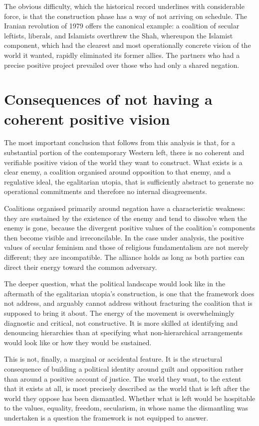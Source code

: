 	The obvious difficulty, which the historical record underlines with considerable
	force, is that the construction phase has a way of not arriving on schedule. The
	Iranian revolution of 1979 offers the canonical example: a coalition of secular
	leftists, liberals, and Islamists overthrew the Shah, whereupon the Islamist
	component, which had the clearest and most operationally concrete vision of the
	world it wanted, rapidly eliminated its former allies. The partners who had a precise
	positive project prevailed over those who had only a shared negation.
	
	\section{Consequences of not having a coherent positive vision}
	
	The most important conclusion that follows from this analysis is that, for a
	substantial portion of the contemporary Western left, there is no coherent and
	verifiable positive vision of the world they want to construct. What exists is a
	clear enemy, a coalition organised around opposition to that enemy, and a regulative
	ideal, the egalitarian utopia, that is sufficiently abstract to generate no
	operational commitments and therefore no internal disagreements.
	
	Coalitions organised primarily around negation have a characteristic weakness: they
	are sustained by the existence of the enemy and tend to dissolve when the enemy is
	gone, because the divergent positive values of the coalition's components then
	become visible and irreconcilable. In the case under analysis, the positive values
	of secular feminism and those of religious fundamentalism are not merely different;
	they are incompatible. The alliance holds as long as both parties can direct their
	energy toward the common adversary.
	
	The deeper question, what the political landscape would look like in the aftermath
	of the egalitarian utopia's construction, is one that the framework does not
	address, and arguably cannot address without fracturing the coalition that is
	supposed to bring it about. The energy of the movement is overwhelmingly diagnostic
	and critical, not constructive. It is more skilled at identifying and denouncing
	hierarchies than at specifying what non-hierarchical arrangements would look like or
	how they would be sustained.
	
	This is not, finally, a marginal or accidental feature. It is the structural
	consequence of building a political identity around guilt and opposition rather than
	around a positive account of justice. The world they want, to the extent that it
	exists at all, is most precisely described as the world that is left after the
	world they oppose has been dismantled. Whether what is left would be hospitable to
	the values, equality, freedom, secularism, in whose name the dismantling was
	undertaken is a question the framework is not equipped to answer.
	
